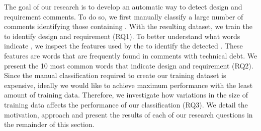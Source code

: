 The goal of our research is to develop an automatic way to detect design and requirement \SATD comments. To do so, we first manually classify a large number of comments identifying those containing \SATD. With the resulting dataset, we train the  to identify design and requirement \SATD (RQ1). To better understand what words indicate \SATD, we inspect the features used by the  to identify the detected \SATD. These features are words that are frequently found in comments with technical debt. We present the 10 most common words that indicate design and requirement \SATD (RQ2). Since the manual classification required to create our training dataset is expensive, ideally we would like to achieve maximum performance with the least amount of training data. Therefore, we investigate how variations in the size of training data affects the performance of our classification (RQ3). We detail the motivation, approach and present the results of each of our research questions in the remainder of this section. 



